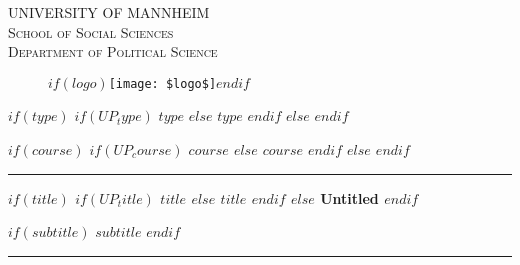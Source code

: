 \documentclass[$if(fontsize)$$fontsize$,$endif$$if(lang)$$babel-lang$,$endif$$if(papersize)$$papersize$paper,$endif$$for(classoption)$$classoption$$sep$,$endfor$]{article}
\begin{document}
\begin{titlepage}

    \begin{center}
    \large{ \textsc{ \uppercase{University of Mannheim} \\ \vspace{-0.2cm}
School of Social Sciences \\ \vspace{-0.2cm}
Department of Political Science}}

      \begin{figure}[!h]
			\centering
			$if(logo)$\texttt{[image: \$logo\$]}$endif$
		\end{figure}

        \vspace{-0.5cm}
       \large{ $if(type)$ $if(UP_type)$ \uppercase{$type$} $else$ $type$ $endif$ $else$  $endif$ }
       
       
       \large{ \textit{ $if(course)$ $if(UP_course)$ \uppercase{$course$} $else$ $course$ $endif$ $else$  $endif$ }}
       
\renewcommand{\linethickness}{0.03em}
\rule{\linewidth}{\linethickness}

        
       \LARGE{ \textbf{ $if(title)$ $if(UP_title)$ \uppercase{$title$} $else$ $title$ $endif$ $else$ Untitled $endif$ }}


       \large{ $if(subtitle)$ $subtitle$ $endif$ }

        \vspace{-0.2cm}
\rule{\linewidth}{\linethickness}



\end{center}
\end{titlepage}
\end{document}
